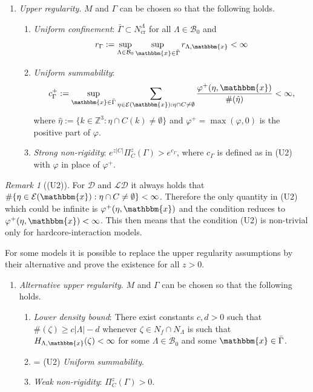 \documentclass[12pt,a4paper]{article}
\theoremstyle{definition}
\theoremstyle{remark}
\newtheorem{remark}{Remark}
\theoremstyle{theorem}
\newcommand{\x}{\mathbbm{x}}
\begin{document}
\begin{enumerate}[\textbf{(U)}] 
	\item \textit{Upper regularity}. $M$ and $\Gamma$ can be chosen so that the following holds. 
		\begin{enumerate}[(U1)]
			\item \textit{Uniform confinement}: $\bar \Gamma \subset N^\Lambda_\text{cr}$ for all $\Lambda \in \mathcal B_0$ and 
			$$r_\Gamma := \sup_{\Lambda\in\mathcal B_0}\sup_{\x \in \bar\Gamma} r_{\Lambda, \x} < \infty$$
			\item \textit{Uniform summability}: 
			$$c^+_\Gamma := \sup_{\x \in \bar\Gamma}  \sum_{\eta \in \mathcal E(\x): \eta \cap C \neq \emptyset} \frac{\varphi^+(\eta,\x)}{\#(\hat\eta)} < \infty,$$
where $\hat\eta := \{k \in \mathbb Z^3: \eta \cap C(k) \neq \emptyset\}$ and $\varphi^+ = \max(\varphi,0)$ is the positive part of $\varphi$.
\item \textit{Strong non-rigidity}: $e^{z|C|} \Pi^z_C(\Gamma) > e^{c_\Gamma}$, where $c_\Gamma$ is defined as in (U2) with $\varphi$ in place of $\varphi^+$.
		\end{enumerate}
\end{enumerate}


\begin{remark}[(U2)]\label{r:U2}
	For $\mathcal D$ and $\mathcal {LD}$ it always holds that $\#\{\eta \in \mathcal E(\x): \eta \cap C \neq \emptyset\}<\infty$. Therefore the only quantity in (U2) which could be infinite is $\varphi^+(\eta,\x)$ and the condition reduces to $\varphi^+(\eta,\x) <  \infty$. This then means that the condition (U2) is non-trivial only for hardcore-interaction models.
\end{remark}



For some models it is possible to replace the upper regularity assumptions by their alternative and prove the existence for all $z>0$.

\begin{enumerate}[(\textbf{\^{U}})]
	\item \textit{Alternative upper regularity}. $M$ and $\Gamma$ can be chosen so that the following holds.
	\begin{enumerate}[(\^U1)]
		\item \textit{Lower density bound}: There exist constants $c,d > 0$ such that $\#(\zeta) \geq c|\Lambda| - d$ whenever $\zeta \in N_f\cap N_\Lambda$ is such that $H_{\Lambda,\x}(\zeta)<\infty$ for some $\Lambda \in \mathcal B_0$ and some $\x \in \bar\Gamma$.
		\item = (U2) \textit{Uniform summability}.
		\item \textit{Weak non-rigidity}: $\Pi^z_C(\Gamma) > 0$.
	\end{enumerate}
\end{enumerate}
\end{document}
